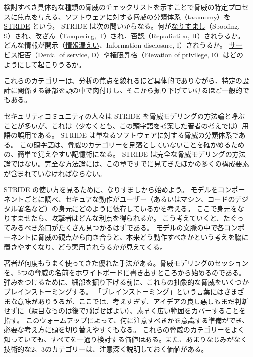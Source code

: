 \documentclass[uplatex]{jsarticle}
\def\label#1{}%
\begin{document}
\begin{dfn}[STRIDE]\label{dfn:ch2-stride}
検討すべき具体的な種類の脅威のチェックリストを示すことで脅威の特定プロセスに焦点を与える、ソフトウェアに対する脅威の分類体系（taxonomy）を \underline{STRIDE} という。
STRIDE は次の問いからなる。何が\underline{なりすまし}（Spoofing, S）され、\underline{改ざん}（Tampering, T）され、\underline{否認}（Repudiation, R）されうるか。
どんな情報が開示（\underline{情報漏えい}、Information disclosure, I）されうるか。
\underline{サービス拒否}（Denial of service, D）や\underline{権限昇格}（Elevation of privilege, E）はどのようにして起こりうるか。
\end{dfn}

これらのカテゴリーは、分析の焦点を絞れるほど具体的でありながら、特定の設計に関係する細部を頭の中で肉付けし、そこから掘り下げていけるほど一般的でもある。

\begin{rem}\label{rem:ch2-stride-not-methodology}
セキュリティコミュニティの人々は STRIDE を脅威モデリングの方法論と呼ぶことが多いが、これは（少なくとも、この頭字語を考案した著者の考えでは）用語の誤用である。
STRIDE は単なるソフトウェアに対する脅威の分類体系である。
この頭字語は、脅威のカテゴリーを見落としていないことを確かめるための、簡単で覚えやすい記憶術になる。
STRIDE は完全な脅威モデリングの方法論ではない。完全な方法論には、この章ですでに見てきたほかの多くの構成要素が含まれていなければならない。
\end{rem}

STRIDE の使い方を見るために、なりすましから始めよう。
モデルをコンポーネントごとに調べ、セキュアな動作がユーザー（あるいはマシン、コードのデジタル署名など）の身元にどのように依存しているかを考える。
ここで身元をなりすませたら、攻撃者はどんな利点を得られるか。
こう考えていくと、たぐってみるべき糸口がたくさん見つかるはずである。
モデルの文脈の中で各コンポーネントに脅威の観点から向き合うと、本来どう動作すべきかという考えを脇に置きやすくなり、どう悪用されうるかが見えてくる。

\begin{rem}[ホワイトボードによるウォームアップ]\label{rem:ch2-stride-whiteboard}
著者が何度もうまく使ってきた優れた手法がある。脅威モデリングのセッションを、6つの脅威の名前をホワイトボードに書き出すところから始めるのである。
弾みをつけるために、細部を掘り下げる前に、これらの抽象的な脅威をいくつかブレインストーミングする。
「ブレインストーミング」という言葉にはさまざまな意味がありうるが、ここでは、考えすぎず、アイデアの良し悪しもまだ判断せずに（駄目なものは後で飛ばせばよい）、素早く広い範囲をカバーすることを指す。
このウォームアップによって、何に注意すべきかを意識する準備ができ、必要な考え方に頭を切り替えやすくもなる。
これらの脅威のカテゴリーをよく知っていても、すべてを一通り検討する価値はある。また、あまりなじみがなく技術的な2、3のカテゴリーは、注意深く説明しておく価値がある。
\end{rem}
\end{document}

